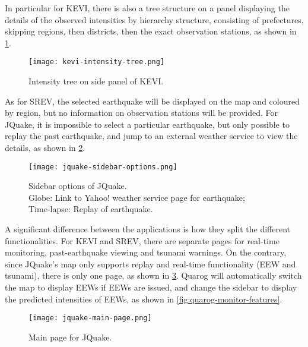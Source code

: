In particular for KEVI, there is also a tree structure on a panel displaying the details of the observed intensities by hierarchy structure, consisting of prefectures, skipping regions, then districts, then the exact observation stations, as shown in \ref{fig:kevi-intensity-tree}.

\begin{figure}[htp]
    \centering

    \texttt{[image: kevi-intensity-tree.png]}
    \caption{Intensity tree on side panel of KEVI.}
    \label{fig:kevi-intensity-tree}
\end{figure}

As for SREV, the selected earthquake will be displayed on the map and coloured by region, but no information on observation stations will be provided. For JQuake, it is impossible to select a particular earthquake, but only possible to replay the past earthquake, and jump to an external weather service to view the details, as shown in \ref{fig:jquake-sidebar-options}.

\begin{figure}[htp]
    \centering

    \texttt{[image: jquake-sidebar-options.png]}
    \caption{Sidebar options of JQuake.\\
        Globe: Link to Yahoo! weather service page for earthquake;\\
        Time-lapse: Replay of earthquake.}
    \label{fig:jquake-sidebar-options}
\end{figure}

A significant difference between the applications is how they split the different functionalities. For KEVI and SREV, there are separate pages for real-time monitoring, past-earthquake viewing and tsunami warnings. On the contrary, since JQuake's map only supports replay and real-time functionality (EEW and tsunami), there is only one page, as shown in \ref{fig:jquake-main-page}. Quarog will automatically switch the map to display EEWs if EEWs are issued, and change the sidebar to display the predicted intensities of EEWs, as shown in \ref{fig:quarog-monitor-features}.

\begin{figure}[htp]
    \centering

    \texttt{[image: jquake-main-page.png]}
    \caption{Main page for JQuake.}
    \label{fig:jquake-main-page}
\end{figure}

